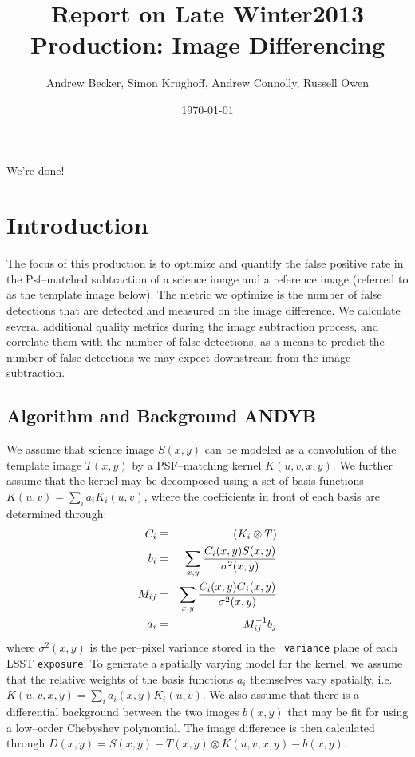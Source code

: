 \documentclass[prd, nofootinbib, floatfix, 11pt,tightenlines,times]{article}
\author{Andrew Becker, Simon Krughoff, Andrew Connolly, Russell Owen}
\title{Report on Late Winter2013 Production: Image Differencing}
\date{\today}
\begin{document}
\maketitle

We're done!

\clearpage
\tableofcontents
\clearpage

\section{Introduction}

The focus of this production is to optimize and quantify the false
positive rate in the Psf--matched subtraction of a science image and a
reference image (referred to as the template image below).  The metric
we optimize is the number of false detections that are detected and
measured on the image difference.  We calculate several additional
quality metrics during the image subtraction process, and correlate
them with the number of false detections, as a means to predict the
number of false detections we may expect downstream from the image
subtraction.

\subsection{Algorithm and Background {\bf ANDYB}}

We assume that science image $S(x,y)$ can be modeled as a convolution
of the template image $T(x,y)$ by a PSF--matching kernel $K(u,v,x,y)$.
We further assume that the kernel may be decomposed using a set of
basis functions $K(u,v) = \sum_i a_i K_i(u,v)$, where the coefficients
in front of each basis are determined through:
%
\begin{eqnarray}
C_i & \equiv & (K_i \otimes T) \\ \nonumber
b_{i}  & = & \sum_{x,y} {{C_i(x,y) S(x,y)}\over{\sigma^2(x,y)}}   \nonumber \\ 
M_{ij} & = & \sum_{x,y} {{C_i(x,y) C_j(x,y)}\over{\sigma^2(x,y)}}  \nonumber \\ 
a_{i}  & = & M^{-1}_{ij} b_{j} \nonumber 
\label{eq-soln}
\end{eqnarray}
where $\sigma^2(x,y)$ is the per--pixel variance stored in the {\tt
  variance} plane of each LSST {\tt exposure}.  To generate a
spatially varying model for the kernel, we assume that the relative
weights of the basis functions $a_i$ themselves vary spatially,
i.e. $K(u,v,x,y) = \sum_i a_i(x,y) K_i(u,v)$.  We also assume that
there is a differential background between the two images $b(x,y)$
that may be fit for using a low--order Chebyshev polynomial.  The
image difference is then calculated through $D(x,y) = S(x,y) - T(x,y)
\otimes K(u,v,x,y) - b(x,y)$.
\end{document}
